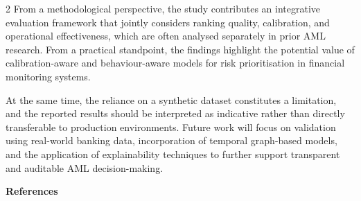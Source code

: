\begin{multicols}{2}
From a methodological perspective, the study contributes an integrative
evaluation framework that jointly considers ranking quality,
calibration, and operational effectiveness, which are often analysed
separately in prior AML research. From a practical standpoint, the
findings highlight the potential value of calibration-aware and
behaviour-aware models for risk prioritisation in financial monitoring
systems.

At the same time, the reliance on a synthetic dataset constitutes a
limitation, and the reported results should be interpreted as indicative
rather than directly transferable to production environments. Future
work will focus on validation using real-world banking data,
incorporation of temporal graph-based models, and the application of
explainability techniques to further support transparent and auditable
AML decision-making.
\end{multicols}

\begin{center}
{\bfseries References}
\end{center}

